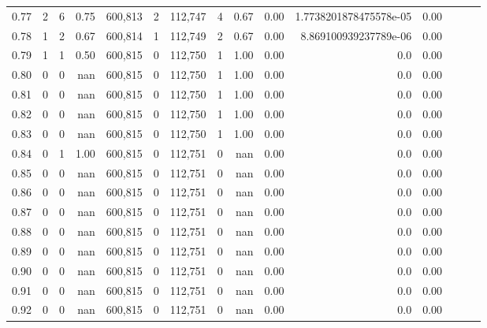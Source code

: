 \begin{tabular}{rrrrrrrrrrrrrrr}
0.77 &       2 &      6 &  0.75 &  600,813 &        2 &  112,747 &        4 &  0.67 &  0.00 &  1.7738201878475578e-05 &      0.00 \\
0.78 &       1 &      2 &  0.67 &  600,814 &        1 &  112,749 &        2 &  0.67 &  0.00 &   8.869100939237789e-06 &      0.00 \\
0.79 &       1 &      1 &  0.50 &  600,815 &        0 &  112,750 &        1 &  1.00 &  0.00 &                     0.0 &      0.00 \\
0.80 &       0 &      0 &   nan &  600,815 &        0 &  112,750 &        1 &  1.00 &  0.00 &                     0.0 &      0.00 \\
0.81 &       0 &      0 &   nan &  600,815 &        0 &  112,750 &        1 &  1.00 &  0.00 &                     0.0 &      0.00 \\
0.82 &       0 &      0 &   nan &  600,815 &        0 &  112,750 &        1 &  1.00 &  0.00 &                     0.0 &      0.00 \\
0.83 &       0 &      0 &   nan &  600,815 &        0 &  112,750 &        1 &  1.00 &  0.00 &                     0.0 &      0.00 \\
0.84 &       0 &      1 &  1.00 &  600,815 &        0 &  112,751 &        0 &   nan &  0.00 &                     0.0 &      0.00 \\
0.85 &       0 &      0 &   nan &  600,815 &        0 &  112,751 &        0 &   nan &  0.00 &                     0.0 &      0.00 \\
0.86 &       0 &      0 &   nan &  600,815 &        0 &  112,751 &        0 &   nan &  0.00 &                     0.0 &      0.00 \\
0.87 &       0 &      0 &   nan &  600,815 &        0 &  112,751 &        0 &   nan &  0.00 &                     0.0 &      0.00 \\
0.88 &       0 &      0 &   nan &  600,815 &        0 &  112,751 &        0 &   nan &  0.00 &                     0.0 &      0.00 \\
0.89 &       0 &      0 &   nan &  600,815 &        0 &  112,751 &        0 &   nan &  0.00 &                     0.0 &      0.00 \\
0.90 &       0 &      0 &   nan &  600,815 &        0 &  112,751 &        0 &   nan &  0.00 &                     0.0 &      0.00 \\
0.91 &       0 &      0 &   nan &  600,815 &        0 &  112,751 &        0 &   nan &  0.00 &                     0.0 &      0.00 \\
0.92 &       0 &      0 &   nan &  600,815 &        0 &  112,751 &        0 &   nan &  0.00 &                     0.0 &      0.00 \\

\end{tabular}
